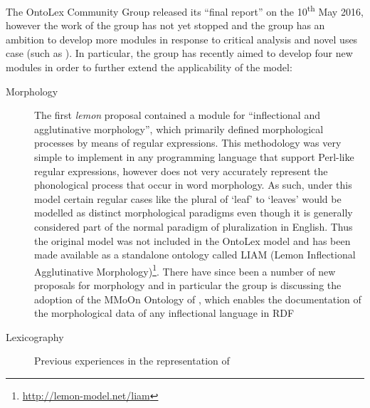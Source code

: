 \documentclass[12pt,a4paper]{elex2017}
\begin{document}
The OntoLex Community Group released its ``final report'' on the
10\textsuperscript{th} May 2016,
however the work of the group has not yet stopped and the group has an ambition
to develop more modules in response to critical analysis and novel uses case
(such as \cite{chavula2014lemon}). In particular, the group has recently aimed
to develop four new modules in order to further extend the applicability of the
model:

\begin{description}
    \item[Morphology] The first \emph{lemon} proposal contained a module for
        ``inflectional and agglutinative morphology'', which primarily defined
        morphological processes by means of regular expressions. This
        methodology was very simple to implement in any programming language
        that support Perl-like regular expressions, however does not very
        accurately represent the phonological process that occur in word
        morphology. As such, under this model certain regular cases like the
        plural of `leaf' to `leaves' would be modelled as distinct morphological
        paradigms even though it is generally considered part of the normal paradigm of
        pluralization in English. Thus the original model was not included in
        the OntoLex model and has been made available as
        a standalone ontology called LIAM (Lemon Inflectional Agglutinative
        Morphology)\footnote{\url{http://lemon-model.net/liam}}. There have
        since been a number of new proposals for morphology and in particular
        the group is discussing the adoption of the MMoOn Ontology of
        \citep{MMoOn_heb}, which enables the documentation of the
        morphological data of any inflectional language in RDF
    \item[Lexicography] Previous experiences in the representation of

\end{description}
\end{document}
